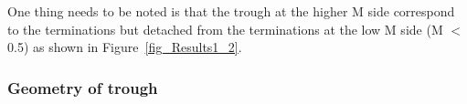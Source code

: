 One thing needs to be noted is that the trough at the higher M side correspond to the terminations but detached from the terminations at the low M side (M $<$ 0.5) as shown in Figure~\hyperref[fig_Results1_2]{\ref{fig_Results1_2}}.

\subsubsection{Geometry of trough}

